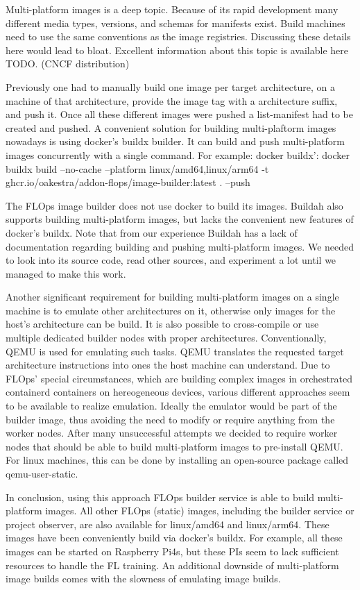 Multi-platform images is a deep topic.
Because of its rapid development many different media types, versions, and schemas for manifests exist.
Build machines need to use the same conventions as the image registries.
Discussing these details here would lead to bloat.
Excellent information about this topic is available here TODO. (CNCF distribution)

Previously one had to manually build one image per target architecture, on a machine of that architecture, provide the image tag with a architecture suffix, and push it.
Once all these different images were pushed a list-manifest had to be created and pushed.
A convenient solution for building multi-plaftorm images nowadays is using docker's buildx builder.
It can build and push multi-platform images concurrently with a single command.
For example: docker buildx': docker buildx build --no-cache --platform linux/amd64,linux/arm64 -t ghcr.io/oakestra/addon-flops/image-builder:latest  . --push

The FLOps image builder does not use docker to build its images.
Buildah also supports building multi-platform images, but lacks the convenient new features of docker's buildx.
Note that from our experience Buildah has a lack of documentation regarding building and pushing multi-platform images.
We needed to look into its source code, read other sources, and experiment a lot until we managed to make this work.

Another significant requirement for building multi-platform images on a single machine is to emulate other architectures on it, otherwise only images for the host's architecture can be build.
It is also possible to cross-compile or use multiple dedicated builder nodes with proper architectures.
Conventionally, QEMU is used for emulating such tasks.
QEMU translates the requested target architecture instructions into ones the host machine can understand.
Due to FLOps' special circumstances, which are building complex images in orchestrated containerd containers on hereogeneous devices, various different approaches seem to be available to realize emulation.
Ideally the emulator would be part of the builder image, thus avoiding the need to modify or require anything from the worker nodes.
After many unsuccessful attempts we decided to require worker nodes that should be able to build multi-platform images to pre-install QEMU.
For linux machines, this can be done by installing an open-source package called qemu-user-static.

In conclusion, using this approach FLOps builder service is able to build multi-platform images.
All other FLOps (static) images, including the builder service or project observer, are also available for linux/amd64 and linux/arm64.
These images have been conveniently build via docker's buildx.
For example, all these images can be started on Raspberry Pi4s, but these PIs seem to lack sufficient resources to handle the FL training.
An additional downside of multi-platform image builds comes with the slowness of emulating image builds.

